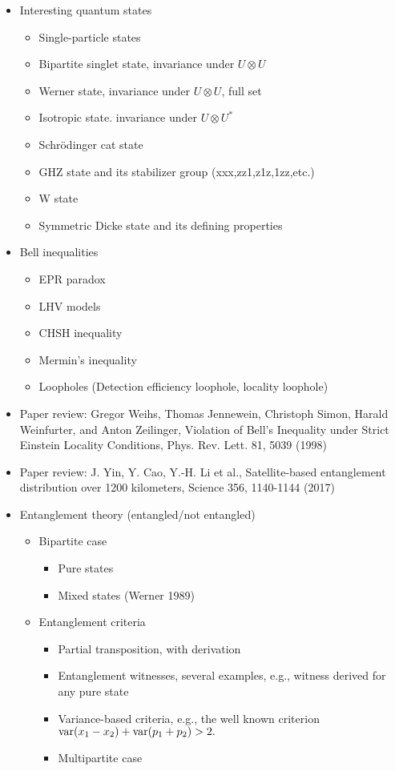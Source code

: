 \documentclass[11pt, oneside]{article}   	%
\begin{document}
\begin{itemize}
\item Interesting quantum states
\begin{itemize}
\item Single-particle states
\item Bipartite singlet state, invariance under $U \otimes U$
\item Werner state, invariance under $U \otimes U$, full set
\item Isotropic state. invariance under $U \otimes U^*$
\item Schrödinger cat state
\item GHZ state and its stabilizer group (xxx,zz1,z1z,1zz,etc.)
\item W state
\item Symmetric Dicke state and its defining properties
\end{itemize}

\item Bell inequalities
\begin{itemize}
\item EPR paradox
\item LHV models
\item CHSH inequality
\item Mermin's inequality
\item Loopholes (Detection efficiency loophole, locality loophole)
\end{itemize}

\item Paper review: Gregor Weihs, Thomas Jennewein, Christoph Simon, Harald Weinfurter, and Anton Zeilinger, Violation of Bell’s Inequality under Strict Einstein Locality Conditions, Phys. Rev. Lett. 81, 5039  (1998)

\item Paper review: J. Yin, Y. Cao, Y.-H. Li et al., Satellite-based entanglement distribution over 1200 kilometers, Science 356, 1140-1144 (2017)

\item Entanglement theory (entangled/not entangled)
\begin{itemize}
\item Bipartite case
\begin{itemize}
\item Pure states
\item Mixed states (Werner  1989)
\end{itemize}
\item Entanglement criteria
\begin{itemize}
\item Partial transposition, with derivation 
\item Entanglement witnesses, several examples, e.g., witness derived for any pure state
\item Variance-based criteria, e.g., the well known criterion\\ ${\rm var}(x_1-x_2)+{\rm var}(p_1+p_2)>2.$
\item Multipartite case
\end{itemize}
\end{itemize}


\end{itemize}
\end{document}

